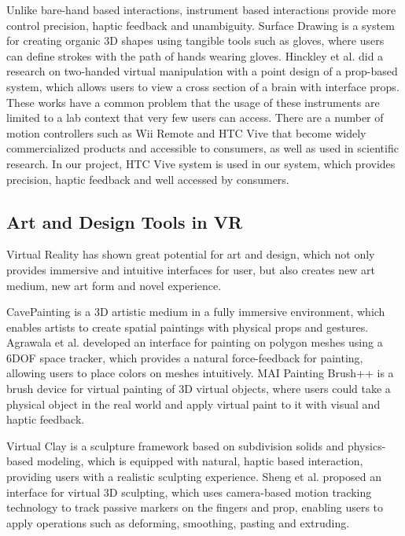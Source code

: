 Unlike bare-hand based interactions, instrument based interactions provide more control precision, haptic feedback and unambiguity.
Surface Drawing \cite{schkolne2001surface} is a system for creating organic 3D shapes using tangible tools such as gloves, where users can define strokes with the path of hands wearing gloves.
Hinckley et al. \cite{hinckley1998two} did a research on two-handed virtual manipulation with a point design of a prop-based system, which allows users to view a cross section of a brain with interface props.
These works have a common problem that the usage of these instruments are limited to a lab context that very few users can access.
There are a number of motion controllers such as Wii Remote \cite{wingcrave2010wii} and HTC Vive \cite{niehorster2017accuracy} that become widely commercialized products and accessible to consumers, as well as used in scientific research.
In our project, HTC Vive system is used in our system, which provides precision, haptic feedback and well accessed by consumers.

\subsection{Art and Design Tools in VR}
\label{sec:2.2}
Virtual Reality has shown great potential for art and design, which not only provides immersive and intuitive interfaces for user, but also creates new art medium, new art form and novel experience\cite{laviola20113d}.

CavePainting \cite{keefe2001cavepainting} is a 3D artistic medium in a fully immersive environment, which enables artists to create spatial paintings with physical props and gestures. Agrawala et al.\cite{agrawala19953d} developed an interface for painting on polygon meshes using a 6DOF space tracker, which provides a natural force-feedback for painting, allowing users to place colors on meshes intuitively. MAI Painting Brush++ \cite{otsuki2017brush} is a brush device for virtual painting of 3D virtual objects, where users could take a physical object in the real world and apply virtual paint to it with visual and haptic feedback.

Virtual Clay \cite{mcdonnell2001virtual} is a sculpture framework based on subdivision solids and physics-based modeling, which is equipped with natural, haptic based interaction, providing users with a realistic sculpting experience. Sheng et al. \cite{sheng2006interface} proposed an interface for virtual 3D sculpting, which uses camera-based motion tracking technology to track passive markers on the fingers and prop, enabling users to apply operations such as deforming, smoothing, pasting and extruding.

